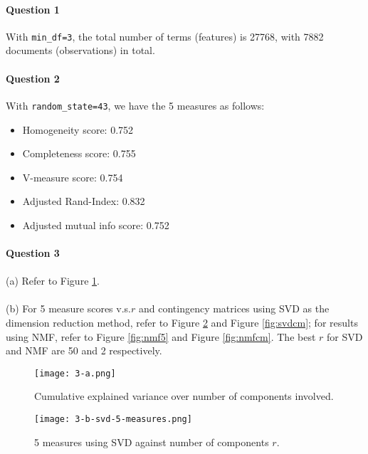\paragraph{Question 1}
With \texttt{min\_df=3}, the total number of terms (features) is 27768, with 7882 documents (observations) in total.
\paragraph{Question 2}
With \texttt{random\_state=43}, we have the 5 measures as follows:
\begin{itemize}
	\setlength{\itemsep}{0pt}
	\item Homogeneity score: 0.752
	\item Completeness score: 0.755
	\item V-measure score: 0.754
	\item Adjusted Rand-Index: 0.832
	\item Adjusted mutual info score: 0.752
\end{itemize}
\paragraph{Question 3} 
\paragraph{} (a) Refer to Figure \ref{fig:explanedVar}. 
\paragraph{} (b) For 5 measure scores v.s.$r$ and contingency matrices using SVD as the dimension reduction method, refer to Figure \ref{fig:svd5} and Figure \ref{fig:svdcm}; for results using NMF, refer to Figure \ref{fig:nmf5} and Figure \ref{fig:nmfcm}. The best $r$ for SVD and NMF are 50 and 2 respectively. 

\begin{figure}[H]
	\centering
	\texttt{[image: 3-a.png]}
	\caption{Cumulative explained variance over number of components involved.}
	\label{fig:explanedVar}
\end{figure}

\begin{figure}[H]
	\centering
	\texttt{[image: 3-b-svd-5-measures.png]}
	\caption{5 measures using SVD against number of components $r$.}
	\label{fig:svd5}
\end{figure}

